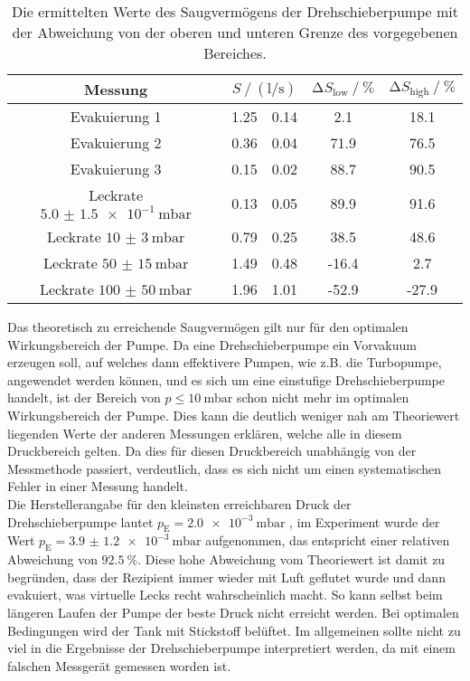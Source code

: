 \begin{table}
    \centering
    \caption{Die ermittelten Werte des Saugvermögens der Drehschieberpumpe mit der Abweichung von der oberen und unteren Grenze des vorgegebenen Bereiches.}
    \label{tab:compare_dreh}
    \begin{tabular}{c  S @{${}\pm{}$} S  S[table-format=2.1] S[table-format=3.1]}
        \toprule
        {Messung} &  & {$\increment S_\text{low} \mathbin{/} \si{\percent}$} & {$\increment S_\text{high} \mathbin{/} \si{\percent}$} \\ 
        \midrule
        Evakuierung 1                       & 1.25 & 0.14 &  2.1 &  18.1\\
        Evakuierung 2                       & 0.36 & 0.04 & 71.9 &  76.5\\
        Evakuierung 3                       & 0.15 & 0.02 & 88.7 &  90.5\\
        Leckrate $\SI{5.0(15)e-1}{\milli\bar}$ & 0.13 & 0.05 & 89.9 &  91.6\\
        Leckrate $\SI{10(3)}{\milli\bar}$   & 0.79 & 0.25 & 38.5 &  48.6\\
        Leckrate $\SI{50(15)}{\milli\bar}$  & 1.49 & 0.48 &-16.4 &   2.7\\
        Leckrate $\SI{100(50)}{\milli\bar}$ & 1.96 & 1.01 &-52.9 & -27.9\\
        \bottomrule
    \end{tabular}
\end{table}

\noindent Das theoretisch zu erreichende Saugvermögen gilt nur für den optimalen Wirkungsbereich der Pumpe. Da eine Drehschieberpumpe ein Vorvakuum erzeugen soll, auf welches dann effektivere Pumpen, 
wie z.B. die Turbopumpe, angewendet werden können, und es sich um eine einstufige Drehschieberpumpe handelt, ist der Bereich von $p \leq \SI{10}{\milli\bar}$ schon nicht mehr im optimalen 
Wirkungsbereich der Pumpe. Dies kann die deutlich weniger nah am Theoriewert liegenden Werte der anderen Messungen erklären, welche alle in diesem Druckbereich gelten. 
Da dies für diesen Druckbereich unabhängig von der Messmethode passiert, verdeutlich, dass es sich nicht um einen systematischen Fehler in einer Messung handelt. \\ 
Die Herstellerangabe für den kleinsten erreichbaren Druck der Drehschieberpumpe lautet $p_\text{E} = \SI{2.0e-3}{\milli\bar}$ \cite{anleitung}, im Experiment wurde der Wert 
$p_\text{E} = \SI{3.9(12)e-3}{\milli\bar}$ aufgenommen, das entspricht einer relativen Abweichung von $\SI{92.5}{\percent}$. Diese hohe Abweichung vom Theoriewert ist damit zu begründen, 
dass der Rezipient immer wieder mit Luft geflutet wurde und dann evakuiert, was virtuelle Lecks recht wahrscheinlich macht. So kann selbst beim längeren Laufen der Pumpe der beste Druck 
nicht erreicht werden. Bei optimalen Bedingungen wird der Tank mit Stickstoff belüftet. Im allgemeinen sollte nicht zu viel in die Ergebnisse der 
Drehschieberpumpe interpretiert werden, da mit einem falschen Messgerät gemessen worden ist. 

